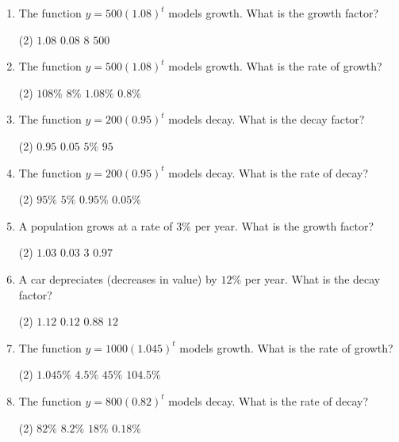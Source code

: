 \documentclass[11pt]{article}
\begin{document}
\begin{enumerate}[leftmargin=1.5em, itemsep=10pt]

\item The function $y = 500(1.08)^t$ models growth. What is the growth factor?
\begin{tasks}(2)
  \task $1.08$
  \task $0.08$
  \task $8$
  \task $500$
\end{tasks}

\item The function $y = 500(1.08)^t$ models growth. What is the rate of growth?
\begin{tasks}(2)
  \task $108\%$
  \task $8\%$
  \task $1.08\%$
  \task $0.8\%$
\end{tasks}

\item The function $y = 200(0.95)^t$ models decay. What is the decay factor?
\begin{tasks}(2)
  \task $0.95$
  \task $0.05$
  \task $5\%$
  \task $95$
\end{tasks}

\item The function $y = 200(0.95)^t$ models decay. What is the rate of decay?
\begin{tasks}(2)
  \task $95\%$
  \task $5\%$
  \task $0.95\%$
  \task $0.05\%$
\end{tasks}

\item A population grows at a rate of $3\%$ per year. What is the growth factor?
\begin{tasks}(2)
  \task $1.03$
  \task $0.03$
  \task $3$
  \task $0.97$
\end{tasks}

\item A car depreciates (decreases in value) by $12\%$ per year. What is the decay factor?
\begin{tasks}(2)
  \task $1.12$
  \task $0.12$
  \task $0.88$
  \task $12$
\end{tasks}

\item The function $y = 1000(1.045)^t$ models growth. What is the rate of growth?
\begin{tasks}(2)
  \task $1.045\%$
  \task $4.5\%$
  \task $45\%$
  \task $104.5\%$
\end{tasks}

\item The function $y = 800(0.82)^t$ models decay. What is the rate of decay?
\begin{tasks}(2)
  \task $82\%$
  \task $8.2\%$
  \task $18\%$
  \task $0.18\%$
\end{tasks}


\end{enumerate}
\end{document}
